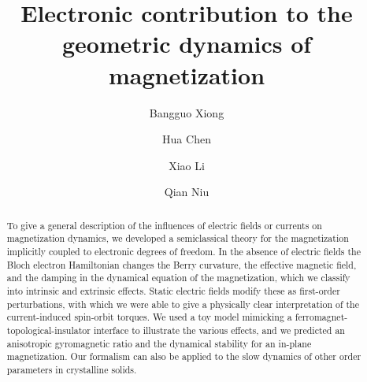 \documentclass[aps,prb,twocolumn,showpacs,superscriptaddress]{revtex4-1}
\begin{document}
\title{Electronic contribution to the geometric dynamics of magnetization}


\author{Bangguo Xiong} 
\author{Hua Chen} 
\author{Xiao Li}
\author{Qian Niu}

\begin{abstract}
To give a general description of the influences of electric fields or currents on magnetization dynamics, we developed a semiclassical theory for the magnetization implicitly coupled to electronic degrees of freedom. In the absence of electric fields the Bloch electron Hamiltonian changes the Berry curvature, the effective magnetic field, and the damping in the dynamical equation of the magnetization, which we classify into intrinsic and extrinsic effects. Static electric fields modify these as first-order perturbations, with which we were able to give a physically clear interpretation of the current-induced spin-orbit torques. We used a toy model mimicking a ferromagnet-topological-insulator interface to illustrate the various effects, and we predicted an anisotropic gyromagnetic ratio and the dynamical stability for an in-plane magnetization. Our formalism can also be applied to the slow dynamics of other order parameters in crystalline solids.
\end{abstract}
\maketitle 
\end{document}
